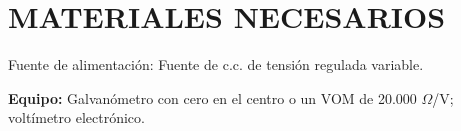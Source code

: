 \documentclass{article}
\numberwithin{equation}{subsection}
\numberwithin{figure}{section}
\numberwithin{table}{section}
\begin{document}
\newpage

\section{MATERIALES NECESARIOS}
Fuente de alimentación: Fuente de c.c. de tensión regulada variable.

\textbf{Equipo:} Galvanómetro con cero en el centro o un VOM de 20.000 $\Omega$/V; voltímetro electrónico.
\end{document}
